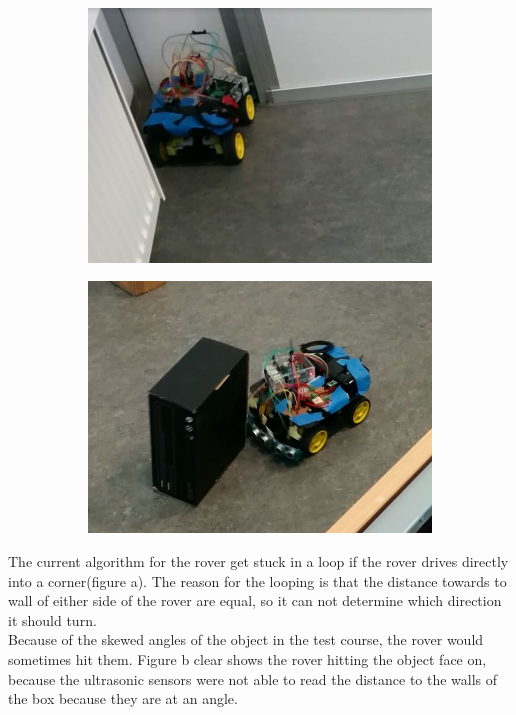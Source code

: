 \clearpage
\begin{figure}[H]
	\centering
	\begin{subfigure}[H]{0.4\textwidth}
		\includegraphics[width=\textwidth]{images/test-stuckincorner.jpg}
		\subcaption{}
	\end{subfigure}%
	\quad
	\begin{subfigure}[H]{0.4\textwidth}
		\includegraphics[width=\textwidth]{images/test-badmeasuringangle.jpg}
		\subcaption{}
	\end{subfigure}
\end{figure}

The current algorithm for the rover get stuck in a loop if the rover drives directly into a corner(figure a). The reason for the looping is that the distance towards to wall of either side of the rover are equal, so it can not determine which direction it should turn.\\
Because of the skewed angles of the object in the test course, the rover would sometimes hit them. Figure b clear shows the rover hitting the object face on, because the ultrasonic sensors were not able to read the distance to the walls of the box because they are at an angle.